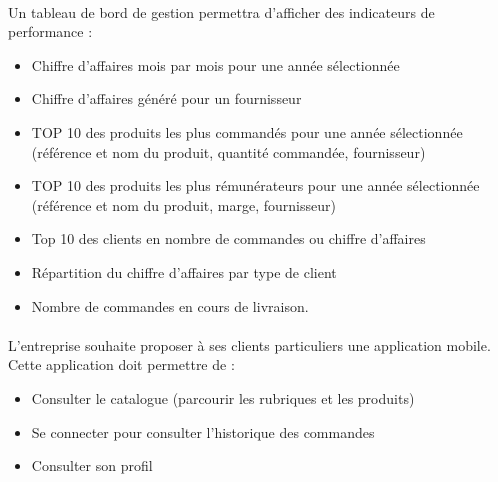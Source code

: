 \documentclass{article}
\begin{document}
\paragraph{}
Un tableau de bord de gestion permettra d'afficher des indicateurs de performance :
\par
\begin{itemize}
  \item Chiffre d'affaires mois par mois pour une année sélectionnée
  \item Chiffre d'affaires généré pour un fournisseur
  \item TOP 10 des produits les plus commandés pour une année sélectionnée (référence et nom du produit, quantité commandée, fournisseur)
  \item TOP 10 des produits les plus rémunérateurs pour une année sélectionnée (référence et nom du produit, marge, fournisseur)
  \item Top 10 des clients en nombre de commandes ou chiffre d'affaires
  \item Répartition du chiffre d'affaires par type de client
  \item Nombre de commandes en cours de livraison.
\end{itemize}
\paragraph{}
L'entreprise souhaite proposer à ses clients particuliers une application mobile. Cette application doit permettre de :
\par
\begin{itemize}
  \item Consulter le catalogue (parcourir les rubriques et les produits)
  \item Se connecter pour consulter l'historique des commandes
  \item Consulter son profil
\end{itemize}
\end{document}
